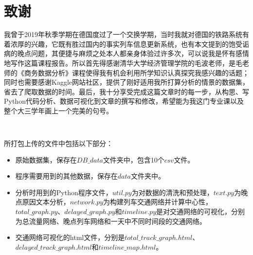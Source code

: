 \documentclass[lang=cn,12pt,a4paper,cite=authoryear]{elegantpaper}
\begin{document}
\section*{致谢}

我曾于2019年秋季学期在德国度过了一个交换学期，当时我就对德国的铁路系统有着浓厚的兴趣，它既有胜过国内的事实列车信息更新系统，也有本文提到的饱受诟病的晚点问题，其便捷与麻烦之处本人都亲身体验过许多次，可以说我是怀有感情地写作这篇课程报告。所以首先得感谢清华大学经济管理学院的毛波老师，是毛老师的《商务数据分析》课程使得我有机会利用所学知识认真探究我感兴趣的话题；同时也需要感谢Kaggle网站社区，提供了刚好适用我所打算分析的情景的数据集，省去了爬取数据的时间。最后，我十分享受完成这篇文章时的每一步，从构思、写Python代码分析、数据可视化到文章的撰写和修改，希望能为我这门专业课以及整个大三学年画上一个完美的句号。

~\\

\nocite{*}


\newpage
\appendix
\appendixpage
\addappheadtotoc

所打包上传的文件中包括以下部分：
\begin{itemize}
	\item 原始数据集，保存在$DB\_data$文件夹中，包含10个$csv$文件。
	\item 程序需要用到的其他数据，保存在$data$文件夹中。
	\item 分析时用到的Python程序文件，$util.py$为对数据的清洗和预处理，$text.py$为晚点原因文本分析，$network.py$为构建列车交通网络并计算中心性，$total\_graph.py$、$delayed\_graph.py$和$timeline.py$是对交通网络的可视化，分别为总流量网络、晚点列车网络和一天中不同时间段的交通网络。
	\item 交通网络可视化的html文件，分别是$total\_track\_graph.html$、$delayed\_track\_graph.html$和$timeline\_map.html$。
\end{itemize}
\end{document}
